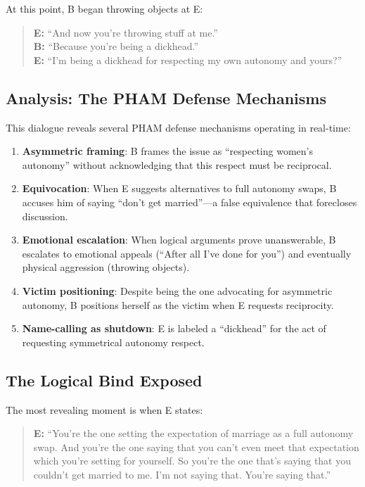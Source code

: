 \documentclass[12pt,openany]{book}
\numberwithin{equation}{chapter}
\begin{document}
At this point, B began throwing objects at E:

\begin{quote}
\textbf{E:} ``And now you're throwing stuff at me.''\\
\textbf{B:} ``Because you're being a dickhead.''\\
\textbf{E:} ``I'm being a dickhead for respecting my own autonomy and yours?''
\end{quote}

\subsection{Analysis: The PHAM Defense Mechanisms}

This dialogue reveals several PHAM defense mechanisms operating in real-time:

\begin{enumerate}
    \item \textbf{Asymmetric framing}: B frames the issue as ``respecting women's autonomy'' without acknowledging that this respect must be reciprocal.
    
    \item \textbf{Equivocation}: When E suggests alternatives to full autonomy swaps, B accuses him of saying ``don't get married''---a false equivalence that forecloses discussion.
    
    \item \textbf{Emotional escalation}: When logical arguments prove unanswerable, B escalates to emotional appeals (``After all I've done for you'') and eventually physical aggression (throwing objects).
    
    \item \textbf{Victim positioning}: Despite being the one advocating for asymmetric autonomy, B positions herself as the victim when E requests reciprocity.
    
    \item \textbf{Name-calling as shutdown}: E is labeled a ``dickhead'' for the act of requesting symmetrical autonomy respect.
\end{enumerate}

\subsection{The Logical Bind Exposed}

The most revealing moment is when E states:

\begin{quote}
\textbf{E:} ``You're the one setting the expectation of marriage as a full autonomy swap. And you're the one saying that you can't even meet that expectation which you're setting for yourself. So you're the one that's saying that you couldn't get married to me. I'm not saying that. You're saying that.''
\end{quote}
\end{document}
